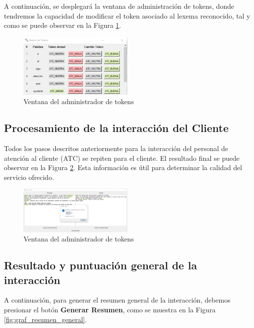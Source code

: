 \documentclass[10pt,times,twocolumn]{article}
\begin{document}
A continuación, se desplegará la ventana de administración de tokens, donde tendremos la capacidad de modificar el token asociado al lexema reconocido, tal y como se puede observar en la Figura \ref{fig:graf_atc_paso7}.

\begin{figure}[H]
    \centering
    \includegraphics[width=0.5\textwidth]{fig/ATC_paso7.png}
    \caption{Ventana del administrador de tokens}
    \label{fig:graf_atc_paso7}
\end{figure}

\subsection{Procesamiento de la interacción del Cliente}
Todos los pasos descritos anteriormente para la interacción del personal de atención al cliente (ATC) se repiten para el cliente. El resultado final se puede observar en la Figura \ref{fig:graf_cliente_resultados}. Esta información es útil para determinar la calidad del servicio ofrecido.

\begin{figure}[H]
    \centering
    \includegraphics[width=0.5\textwidth]{fig/cliente_resultados.png}
    \caption{Ventana del administrador de tokens}
    \label{fig:graf_cliente_resultados}
\end{figure}

\subsection{Resultado y puntuación general de la interacción}
A continuación, para generar el resumen general de la interacción, debemos presionar el botón \textbf{Generar Resumen}, como se muestra en la Figura \ref{fig:graf_resumen_general}.
\end{document}
